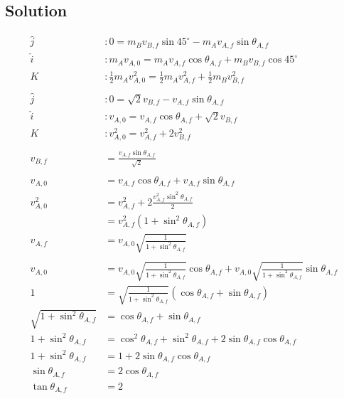 \documentclass[solutions]{esg8012pset}
\begin{document}
\subsection*{Solution}
  \begin{align*}
  \hat j& : 0 = m_B v_{B,f}\sin 45^{\circ} - m_A v_{A, f}\sin\theta_{A, f} \\
  \hat i& : m_A v_{A, 0} = m_A v_{A, f}\cos \theta_{A, f} + m_B v_{B, f}\cos 45^{\circ} \\
  K& : \frac{1}{2}m_A v_{A, 0}^2 = \frac{1}{2}m_Av_{A,f}^2 + \frac{1}{2}m_B v_{B, f}^2 \\
  \\
  \hat j& : 0 = \sqrt{2} v_{B,f} - v_{A, f}\sin\theta_{A, f} \\
  \hat i& : v_{A, 0} = v_{A, f}\cos \theta_{A, f} + \sqrt{2}v_{B, f} \\
  K& : v_{A, 0}^2 = v_{A,f}^2 + 2 v_{B, f}^2 \\
  \\
  v_{B,f} & = \frac{v_{A, f}\sin\theta_{A, f}}{\sqrt{2}} \\
  \\
  v_{A, 0} & = v_{A, f}\cos \theta_{A, f} + v_{A, f}\sin\theta_{A, f} \\
  v_{A, 0}^2 & = v_{A,f}^2 + 2 \frac{v_{A, f}^2\sin^2\theta_{A, f}}{2} \\
    & = v_{A,f}^2\left(1 + \sin^2\theta_{A, f}\right) \\
  v_{A, f} & = v_{A, 0}\sqrt{\frac{1}{1 + \sin^2\theta_{A, f}}} \\
  \\
  v_{A, 0} & = v_{A, 0}\sqrt{\frac{1}{1 + \sin^2\theta_{A, f}}}\cos \theta_{A, f} + v_{A, 0}\sqrt{\frac{1}{1 + \sin^2\theta_{A, f}}}\sin\theta_{A, f} \\
  1 & = \sqrt{\frac{1}{1 + \sin^2\theta_{A, f}}}\left(\cos \theta_{A, f} + \sin\theta_{A, f}\right) \\
  \sqrt{1 + \sin^2\theta_{A, f}} & = \cos \theta_{A, f} + \sin\theta_{A, f} \\
  1 + \sin^2\theta_{A, f} & = \cos^2 \theta_{A, f} + \sin^2\theta_{A, f} + 2 \sin \theta_{A, f}\cos \theta_{A, f}\\
  1 + \sin^2\theta_{A, f} & = 1 + 2 \sin \theta_{A, f}\cos \theta_{A, f}\\
  \sin\theta_{A, f} & = 2 \cos \theta_{A, f}\\
  \tan\theta_{A, f} & = 2

\end{align*}
\end{document}
